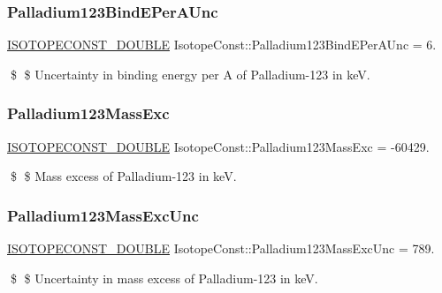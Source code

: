 \subsubsection{\texorpdfstring{Palladium123\+Bind\+E\+Per\+A\+Unc}{Palladium123BindEPerAUnc}}
{\footnotesize\ttfamily \mbox{\hyperlink{group___isotope_const-_macros_ga8f45a7272ce02c0b4c65c44636ed719a}{I\+S\+O\+T\+O\+P\+E\+C\+O\+N\+S\+T\+\_\+\+D\+O\+U\+B\+LE}} Isotope\+Const\+::\+Palladium123\+Bind\+E\+Per\+A\+Unc = 6.}

\$ \$ Uncertainty in binding energy per A of Palladium-\/123 in keV. \mbox{\label{group___isotope_const-_palladium-_pd123_ga1c5571e91b2437f74fe350acc9d44d84}} 
\subsubsection{\texorpdfstring{Palladium123\+Mass\+Exc}{Palladium123MassExc}}
{\footnotesize\ttfamily \mbox{\hyperlink{group___isotope_const-_macros_ga8f45a7272ce02c0b4c65c44636ed719a}{I\+S\+O\+T\+O\+P\+E\+C\+O\+N\+S\+T\+\_\+\+D\+O\+U\+B\+LE}} Isotope\+Const\+::\+Palladium123\+Mass\+Exc = -\/60429.}

\$ \$ Mass excess of Palladium-\/123 in keV. \mbox{\label{group___isotope_const-_palladium-_pd123_ga43dca3fbec08866a231a71c55e9534e6}} 
\subsubsection{\texorpdfstring{Palladium123\+Mass\+Exc\+Unc}{Palladium123MassExcUnc}}
{\footnotesize\ttfamily \mbox{\hyperlink{group___isotope_const-_macros_ga8f45a7272ce02c0b4c65c44636ed719a}{I\+S\+O\+T\+O\+P\+E\+C\+O\+N\+S\+T\+\_\+\+D\+O\+U\+B\+LE}} Isotope\+Const\+::\+Palladium123\+Mass\+Exc\+Unc = 789.}

\$ \$ Uncertainty in mass excess of Palladium-\/123 in keV. \mbox{\label{group___isotope_const-_palladium-_pd123_ga2ca96434cb47b204e03adab5346a787f}} 
